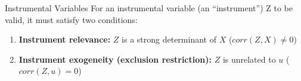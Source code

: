 \documentclass[notes,10pt, aspectratio=169]{beamer}
\begin{document}
\begin{frame}{Instrumental Variables}
For an instrumental variable (an “instrument”) Z to be valid, it must satisfy two conditions:
\begin{enumerate}
    \item \textbf{Instrument relevance:} $Z$ is a strong determinant of $X$ ($corr(Z, X)\neq 0$)
    \item \textbf{Instrument exogeneity (exclusion restriction):} $Z$ is unrelated to $u$ ($corr(Z, u) = 0$)
\end{enumerate}

\begin{center}
\begin{figure}
\end{figure}
\end{center}
\end{frame}
\end{document}

